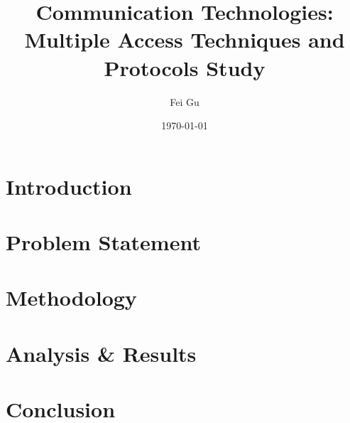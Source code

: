 \documentclass{article}
\title{Communication Technologies: Multiple Access Techniques and Protocols Study}
\author{Fei Gu}
\date{\today}
\begin{document}
\maketitle

\section{Introduction}
\paragraph{} 

\section{Problem Statement}

\paragraph{}

\section{Methodology}

\section{Analysis \& Results}

\section{Conclusion}
\end{document}
